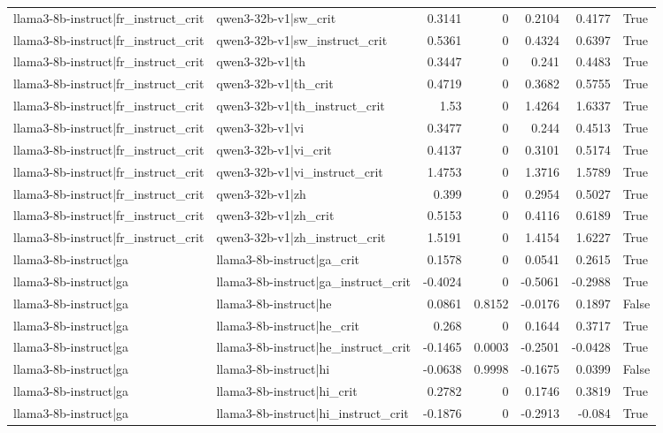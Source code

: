 \begin{table}
\begin{tabular}{l l r r r r l}
llama3-8b-instruct|fr_instruct_crit & qwen3-32b-v1|sw_crit & 0.3141 & 0 & 0.2104 & 0.4177 & True \\
llama3-8b-instruct|fr_instruct_crit & qwen3-32b-v1|sw_instruct_crit & 0.5361 & 0 & 0.4324 & 0.6397 & True \\
llama3-8b-instruct|fr_instruct_crit & qwen3-32b-v1|th & 0.3447 & 0 & 0.241 & 0.4483 & True \\
llama3-8b-instruct|fr_instruct_crit & qwen3-32b-v1|th_crit & 0.4719 & 0 & 0.3682 & 0.5755 & True \\
llama3-8b-instruct|fr_instruct_crit & qwen3-32b-v1|th_instruct_crit & 1.53 & 0 & 1.4264 & 1.6337 & True \\
llama3-8b-instruct|fr_instruct_crit & qwen3-32b-v1|vi & 0.3477 & 0 & 0.244 & 0.4513 & True \\
llama3-8b-instruct|fr_instruct_crit & qwen3-32b-v1|vi_crit & 0.4137 & 0 & 0.3101 & 0.5174 & True \\
llama3-8b-instruct|fr_instruct_crit & qwen3-32b-v1|vi_instruct_crit & 1.4753 & 0 & 1.3716 & 1.5789 & True \\
llama3-8b-instruct|fr_instruct_crit & qwen3-32b-v1|zh & 0.399 & 0 & 0.2954 & 0.5027 & True \\
llama3-8b-instruct|fr_instruct_crit & qwen3-32b-v1|zh_crit & 0.5153 & 0 & 0.4116 & 0.6189 & True \\
llama3-8b-instruct|fr_instruct_crit & qwen3-32b-v1|zh_instruct_crit & 1.5191 & 0 & 1.4154 & 1.6227 & True \\
llama3-8b-instruct|ga & llama3-8b-instruct|ga_crit & 0.1578 & 0 & 0.0541 & 0.2615 & True \\
llama3-8b-instruct|ga & llama3-8b-instruct|ga_instruct_crit & -0.4024 & 0 & -0.5061 & -0.2988 & True \\
llama3-8b-instruct|ga & llama3-8b-instruct|he & 0.0861 & 0.8152 & -0.0176 & 0.1897 & False \\
llama3-8b-instruct|ga & llama3-8b-instruct|he_crit & 0.268 & 0 & 0.1644 & 0.3717 & True \\
llama3-8b-instruct|ga & llama3-8b-instruct|he_instruct_crit & -0.1465 & 0.0003 & -0.2501 & -0.0428 & True \\
llama3-8b-instruct|ga & llama3-8b-instruct|hi & -0.0638 & 0.9998 & -0.1675 & 0.0399 & False \\
llama3-8b-instruct|ga & llama3-8b-instruct|hi_crit & 0.2782 & 0 & 0.1746 & 0.3819 & True \\
llama3-8b-instruct|ga & llama3-8b-instruct|hi_instruct_crit & -0.1876 & 0 & -0.2913 & -0.084 & True \\

\end{tabular}
\end{table}
